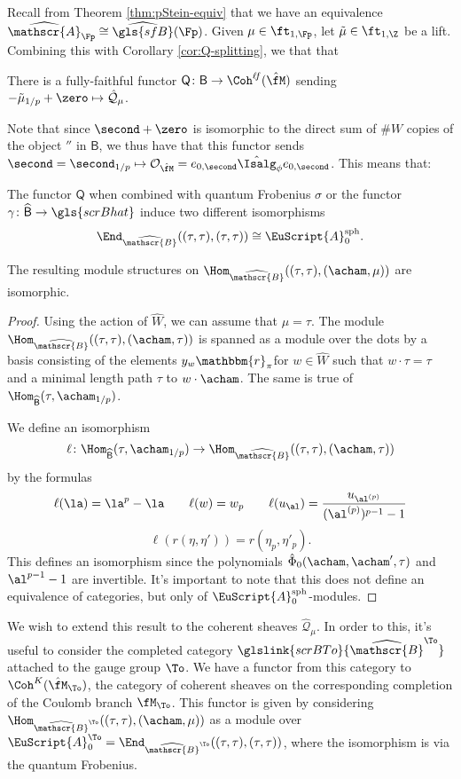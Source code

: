 Recall from Theorem \ref{thm:pStein-equiv} that we have an equivalence $\widehat{\mathscr{A}}_{\Fp}\cong \widehat{\gls{sfB}}(\Fp)$. Given $\mu\in \ft_{1,\Fp}$, let $\tilde{\mu}\in \ft_{1,\Z}$ be a lift. Combining this with Corollary \ref{cor:Q-splitting}, we that that
\begin{lemma}\label{lem:Gamma-iso}
There is a fully-faithful functor $\mathsf{Q}\colon \mathsf{B}\to  \Coh^{\ell \!f}(\hat{\fM})$ sending $- \tilde{\mu}_{1/p}+\zero\mapsto \mathcal{\hat Q}_\mu$.  \end{lemma}
Note that since $\second+\zero$ is isomorphic to the direct sum of $\# W$ copies of the object $\second$ in $\mathsf{B}$, we thus have that this functor sends $\second=\second_{1/p}\mapsto \mathcal{O}_{\hat{\fM}}=e_{0,\second}\hat{\Isalg}_\phi e_{0,\second}$. This means that:
\begin{lemma}\label{lem:Frob-or-B}
  The functor $\mathsf{Q}$ when combined with quantum Frobenius $\sigma$ or the functor $\gamma\colon \widehat{\mathsf{B}}\to \gls{scrBhat}$ induce two different isomorphisms \[\End_{\widehat{\mathscr{B}}}((\tau, \tau),(\tau, \tau))\cong \EuScript{A}^{\operatorname{sph}}_0.\]

The resulting module structures on $\Hom_{\widehat{\mathscr{B}}}( (\tau,\tau),(\acham,\mu))$ are isomorphic.  
\end{lemma}
\begin{proof}
  Using the action of $\widehat{W}$, we can assume that $\mu=\tau$.
  The module $\Hom_{\widehat{\mathscr{B}}}( (\tau,\tau),(\acham,\tau))$ is spanned as a module over the dots by a basis consisting of the elements $y_w\mathbbm{r}_{\pi}$for $w\in \widehat{W}$ such that $w\cdot \tau=\tau$ and  a minimal length path $\tau$ to $w\cdot \acham$.  The same is true of $\Hom_{\widehat{\mathsf{B}}}(\tau,\acham_{1/p})$.

  We define an isomorphism \[\ell\colon \Hom_{\widehat{\mathsf{B}}}(\tau,\acham_{1/p})\to \Hom_{\widehat{\mathscr{B}}}( (\tau,\tau),(\acham,\tau)) \]
by the formulas
\[ \ell(\la)=\la^p-\la \qquad \ell(w)=w_p\qquad\ell(u_{\al})=\frac{u_{\al^{(p)}}}{(\al^{(p)})^{p-1}-1}\]
\[\ell(r(\eta,\eta')) =r(\eta_{p},\eta'_{p}).\]
This defines an isomorphism since the polynomials $\hat \Phi_0(\acham,\acham',\tau)$ and $\al^{p-1}-1$ are invertible.  It's important to note that this does not define an equivalence of categories, but only of $\EuScript{A}^{\operatorname{sph}}_0$-modules.
\end{proof}

We wish to extend this result to the coherent sheaves $\mathcal{\hat Q}_\mu$.  In order to this, it's useful to  consider the completed category $\glslink{scrBTo}{\widehat{\mathscr{B}}^{\To}}$ attached to the gauge group $\To$.  We have a functor from this category to $\Coh^K(\hat{\fM}_{\To})$, the category of coherent sheaves on the corresponding completion of the Coulomb branch $\fM _{\To}$.  This functor is given by considering $\Hom_{\widehat{\mathscr{B}}^{\To}}( (\tau,\tau),(\acham,\mu))$ as a module over $\EuScript{A}^{\To}_0=\End_{\widehat{\mathscr{B}}^{\To}}((\tau, \tau),(\tau, \tau))$, where the isomorphism is via the quantum Frobenius.

